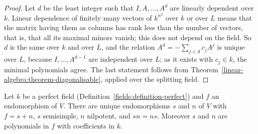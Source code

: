 \begin{proof}
Let $d$ be the least integer such that $I, A, \ldots, A^d$ are linearly dependent over $k$. Linear
dependence of finitely many vectors of $k^{n^2}$ over $k$ or over $L$ means that the matrix having
them as columns has rank less than the number of vectors, that is, that all its maximal minors
vanish; this does not depend on the field. So $d$ is the same over $k$ and over $L$, and the
relation $A^d = -\sum_{j<d}c_jA^j$ is unique over $L$, because $I, \ldots, A^{d-1}$ are independent
over $L$; as it exists with $c_j \in k$, the minimal polynomials agree. The last statement follows
from Theorem~\ref{linear-algebra:theorem-diagonalisable}, applied over the splitting field.
\end{proof}

\begin{theorem}\label{linear-algebra:theorem-jordan-chevalley}
Let $k$ be a perfect field (Definition~\ref{fields:definition-perfect}) and $f$ an endomorphism of
$V$. There are unique endomorphisms $s$ and $n$ of $V$ with $f = s + n$, $s$ semisimple, $n$
nilpotent, and $sn = ns$. Moreover $s$ and $n$ are polynomials in $f$ with coefficients in $k$.
\end{theorem}

